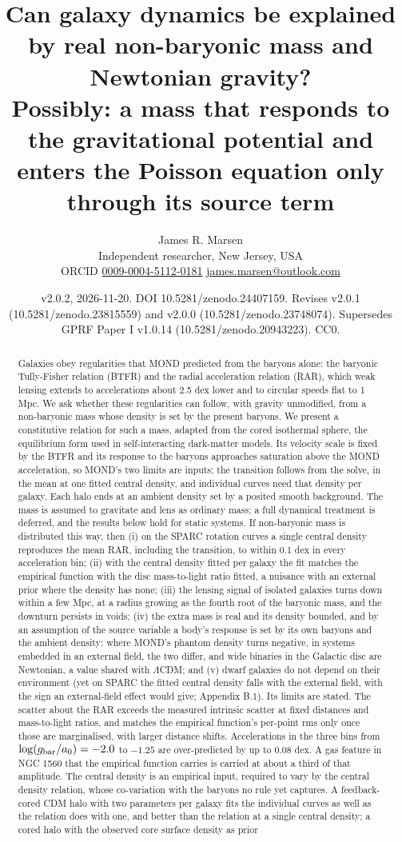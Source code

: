 \documentclass[
  10pt,
]{article}
\title{Can galaxy dynamics be explained by real non-baryonic mass and Newtonian gravity?\\[0.6ex]{\large Possibly: a mass that responds to the gravitational potential and enters the Poisson equation only through its source term}}
\author{James R. Marsen\\[2pt]
  {\normalsize Independent researcher, New Jersey, USA}\\[2pt]
  {\normalsize ORCID \href{https://orcid.org/0009-0004-5112-0181}{0009-0004-5112-0181}
   \quad \href{mailto:james.marsen@outlook.com}{james.marsen@outlook.com}}}
\date{v2.0.2, 2026-11-20. DOI 10.5281/zenodo.24407159. Revises v2.0.1 (10.5281/zenodo.23815559) and v2.0.0 (10.5281/zenodo.23748074). Supersedes GPRF Paper I v1.0.14 (10.5281/zenodo.20943223). CC0.}
\begin{document}
\maketitle

\begin{abstract}
Galaxies obey regularities that MOND predicted from the baryons alone: the baryonic Tully-Fisher relation (BTFR) and the radial acceleration relation (RAR), which weak lensing extends to accelerations about 2.5 dex lower and to circular speeds flat to 1 Mpc. We ask whether these regularities can follow, with gravity unmodified, from a non-baryonic mass whose density is set by the present baryons. We present a constitutive relation for such a mass, adapted from the cored isothermal sphere, the equilibrium form used in self-interacting dark-matter models. Its velocity scale is fixed by the BTFR and its response to the baryons approaches saturation above the MOND acceleration, so MOND's two limits are inputs; the transition follows from the solve, in the mean at one fitted central density, and individual curves need that density per galaxy. Each halo ends at an ambient density set by a posited smooth background. The mass is assumed to gravitate and lens as ordinary mass; a full dynamical treatment is deferred, and the results below hold for static systems. If non-baryonic mass is distributed this way, then (i) on the SPARC rotation curves a single central density reproduces the mean RAR, including the transition, to within 0.1 dex in every acceleration bin; (ii) with the central density fitted per galaxy the fit matches the empirical function with the disc mass-to-light ratio fitted, a nuisance with an external prior where the density has none; (iii) the lensing signal of isolated galaxies turns down within a few Mpc, at a radius growing as the fourth root of the baryonic mass, and the downturn persists in voids; (iv) the extra mass is real and its density bounded, and by an assumption of the source variable a body's response is set by its own baryons and the ambient density: where MOND's phantom density turns negative, in systems embedded in an external field, the two differ, and wide binaries in the Galactic disc are Newtonian, a value shared with $\Lambda$CDM; and (v) dwarf galaxies do not depend on their environment (yet on SPARC the fitted central density falls with the external field, with the sign an external-field effect would give; Appendix B.1). Its limits are stated. The scatter about the RAR exceeds the measured intrinsic scatter at fixed distances and mass-to-light ratios, and matches the empirical function's per-point rms only once those are marginalised, with larger distance shifts. Accelerations in the three bins from $\log(g_{\rm bar}/a_0)=-2.0$ to $-1.25$ are over-predicted by up to 0.08 dex. A gas feature in NGC 1560 that the empirical function carries is carried at about a third of that amplitude. The central density is an empirical input, required to vary by the central density relation, whose co-variation with the baryons no rule yet captures. A feedback-cored CDM halo with two parameters per galaxy fits the individual curves as well as the relation does with one, and better than the relation at a single central density; a cored halo with the observed core surface density as prior 
\end{abstract}
\end{document}
